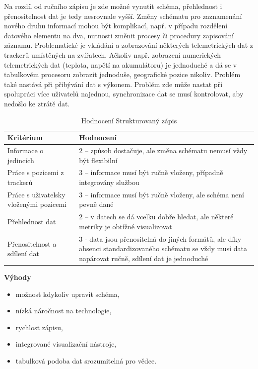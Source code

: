 Na rozdíl od ručního zápisu je zde možné vynutit schéma, přehlednost i přenositelnost dat je tedy nesrovnale vyšší. Změny schématu pro zaznamenání nového druhu informací mohou být komplikací, např. v případu rozdělení datového elementu na dva, nutnosti změnit procesy či procedury zapisování záznamu. Problematické je vkládání a zobrazování některých telemetrických dat z trackerů umístěných na zvířatech. Ačkoliv např. zobrazení numerických telemetrických dat (teplota, napětí na akumulátoru) je jednoduché a dá se v tabulkovém procesoru zobrazit jednoduše, geografické pozice nikoliv. Problém také nastává při přibývání dat s výkonem. Problém zde může nastat při spolupráci více uživatelů najednou, synchronizace dat se musí kontrolovat, aby nedošlo ke ztrátě dat.

\begin{table}[h]
	\begin{tabular}{ l | l }
		Kritérium                              & Hodnocení \\
		\hline			
		Informace o jedincích                  & 2 -- způsob dostačuje, ale změna schématu nemusí vždy být flexibilní          \\
		Práce s pozicemi z trackerů            & 3 -- informace musí být ručně vloženy, případně integrovány službou          \\
		Práce s uživatelsky vloženými pozicemi & 3 -- informace musí být ručně vloženy, ale schéma není pevně dané          \\
		Přehlednost dat                        & 2 -- v datech se dá vcelku dobře hledat, ale některé metriky je obtížné visualizovat          \\
		Přenositelnost a sdílení dat           & 3 - data jsou přenositelná do jiných formátů, ale díky absenci standardizovaného schématu se vždy musí data napárovat ručně, sdílení dat je jednoduché          \\
		\hline	
	\end{tabular}
	\caption{Hodnocení Strukturovaný zápis}
\end{table}

\textbf{Výhody}

\begin{itemize}
	\item možnost kdykoliv upravit schéma,
	\item nízká náročnost na technologie,
	\item rychlost zápisu,
	\item integrované visualizační nástroje,
	\item tabulková podoba dat srozumitelná pro vědce.
\end{itemize}


